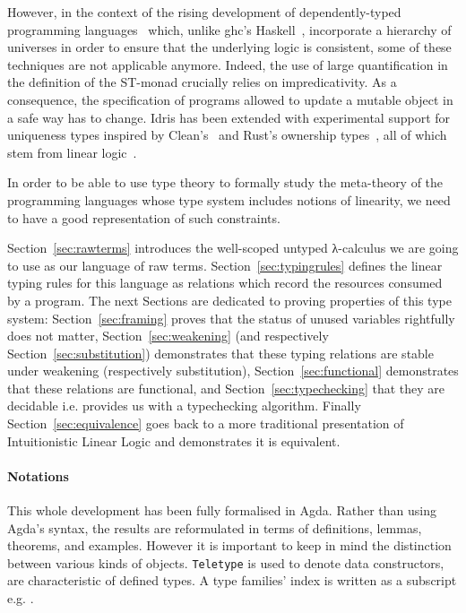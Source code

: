 \documentclass[a4paper,UKenglish]{lipics-v2016}
\begin{document}
However, in the context of the rising development of dependently-typed
programming languages~\cite{Brady2013idris, norell2009dependently} which,
unlike ghc's Haskell~\cite{weirich2013towards}, incorporate a hierarchy
of universes in order to ensure that the underlying logic is consistent,
some of these techniques are not applicable anymore. Indeed, the use of
large quantification in the definition of the ST-monad crucially relies
on impredicativity. As a consequence, the specification of programs
allowed to update a mutable object in a safe way has to change.
Idris has been extended with experimental support for uniqueness types
inspired by Clean's~\cite{achten1993high} and Rust's ownership types~\cite{manual:rust},
all of which stem from linear logic~\cite{girard1987linear}.

In order to be able to use type theory to formally study the meta-theory
of the programming languages whose type system includes notions of linearity,
we need to have a good representation of such constraints.

Section~\ref{sec:rawterms} introduces the well-scoped untyped λ-calculus
we are going to use as our language of raw terms. Section~\ref{sec:typingrules}
defines the linear typing rules for this language as relations which
record the resources consumed by a program. The next Sections are dedicated
to proving properties of this type system: Section~\ref{sec:framing}
proves that the status of unused variables rightfully does not matter,
Section~\ref{sec:weakening} (and respectively Section~\ref{sec:substitution})
demonstrates that these typing relations are stable under weakening
(respectively substitution), Section~\ref{sec:functional} demonstrates that
these relations are functional, and Section~\ref{sec:typechecking} that
they are decidable i.e. provides us with a typechecking algorithm. Finally
Section~\ref{sec:equivalence} goes back to a more traditional presentation
of Intuitionistic Linear Logic and demonstrates it is equivalent.


\paragraph*{Notations} This whole development has been fully formalised
in Agda. Rather than using Agda's syntax, the results are reformulated
in terms of definitions, lemmas, theorems, and examples. However it is
important to keep in mind the distinction between various kinds of objects.
\texttt{Teletype} is used to denote data constructors,  are characteristic of defined types. A type families' index is
written as a subscript e.g. .
\end{document}
